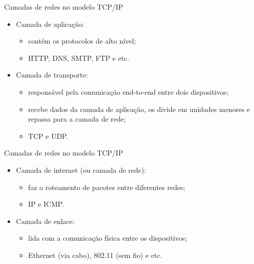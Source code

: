 \begin{frame}[fragile]{Camadas de redes no modelo TCP/IP}
    \begin{itemize}%
        \item Camada de aplicação:
            \begin{itemize}%
                \item contém os protocolos de alto nível;
                \item HTTP, DNS, SMTP, FTP e etc.
            \end{itemize}
        \item Camada de transporte:
            \begin{itemize}%
                \item responsável pela comunicação end-to-end entre dois dispositivos;
                \item recebe dados da camada de aplicação, os divide em unidades menores e repassa para a camada de rede;
                \item TCP e UDP.
            \end{itemize}
    \end{itemize}
\end{frame}

\begin{frame}[fragile]{Camadas de redes no modelo TCP/IP}
    \begin{itemize}%
        \item Camada de internet (ou camada de rede):
            \begin{itemize}%
                \item faz o roteamento de pacotes entre diferentes redes;
                \item IP e ICMP.
            \end{itemize}
        \item Camada de enlace:
            \begin{itemize}%
                \item lida com a comunicação física entre os dispositivos;
                \item Ethernet (via cabo), 802.11 (sem fio) e etc.
            \end{itemize}
    \end{itemize}
\end{frame}
